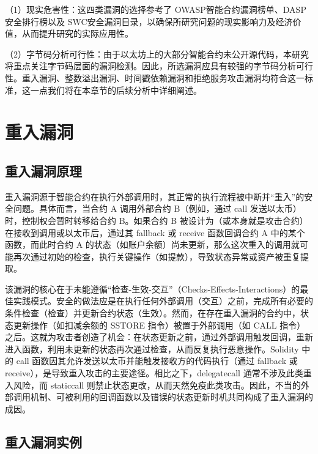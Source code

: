 \documentclass[print, master, vlined, timesmath]{DissertUESTC}
\begin{document}
（1）现实危害性：这四类漏洞的选择参考了 OWASP智能合约漏洞榜单、DASP安全排行榜以及 SWC安全漏洞目录，以确保所研究问题的现实影响力及经济价值，从而提升研究的实际应用性。

（2）字节码分析可行性：由于以太坊上的大部分智能合约未公开源代码，本研究将重点关注字节码层面的漏洞检测。因此，所选漏洞应具有较强的字节码分析可行性。重入漏洞、整数溢出漏洞、时间戳依赖漏洞和拒绝服务攻击漏洞均符合这一标准，这一点我们将在本章节的后续分析中详细阐述。




\section{重入漏洞}

\subsection{重入漏洞原理}

重入漏洞源于智能合约在执行外部调用时，其正常的执行流程被中断并“重入”的安全问题。具体而言，当合约 A 调用外部合约 B（例如，通过 call 发送以太币）时，控制权会暂时转移给合约 B。如果合约 B 被设计为（或本身就是攻击合约）在接收到调用或以太币后，通过其 fallback 或 receive 函数回调合约 A 中的某个函数，而此时合约 A 的状态（如账户余额）尚未更新，那么这次重入的调用就可能再次通过初始的检查，执行关键操作（如提款），导致状态异常或资产被重复提取。

该漏洞的核心在于未能遵循“检查-生效-交互”（Checks-Effects-Interactions）的最佳实践模式。安全的做法应是在执行任何外部调用（交互）之前，完成所有必要的条件检查（检查）并更新合约状态（生效）。然而，在存在重入漏洞的合约中，状态更新操作（如扣减余额的 SSTORE 指令）被置于外部调用（如 CALL 指令）之后。这就为攻击者创造了机会：在状态更新之前，通过外部调用触发回调，重新进入函数，利用未更新的状态再次通过检查，从而反复执行恶意操作。Solidity 中的 call 函数因其允许发送以太币并能触发接收方的代码执行（通过 fallback 或 receive），是导致重入攻击的主要途径。相比之下，delegatecall 通常不涉及此类重入风险，而 staticcall 则禁止状态更改，从而天然免疫此类攻击。因此，不当的外部调用机制、可被利用的回调函数以及错误的状态更新时机共同构成了重入漏洞的成因。

\subsection{重入漏洞实例}
\end{document}
